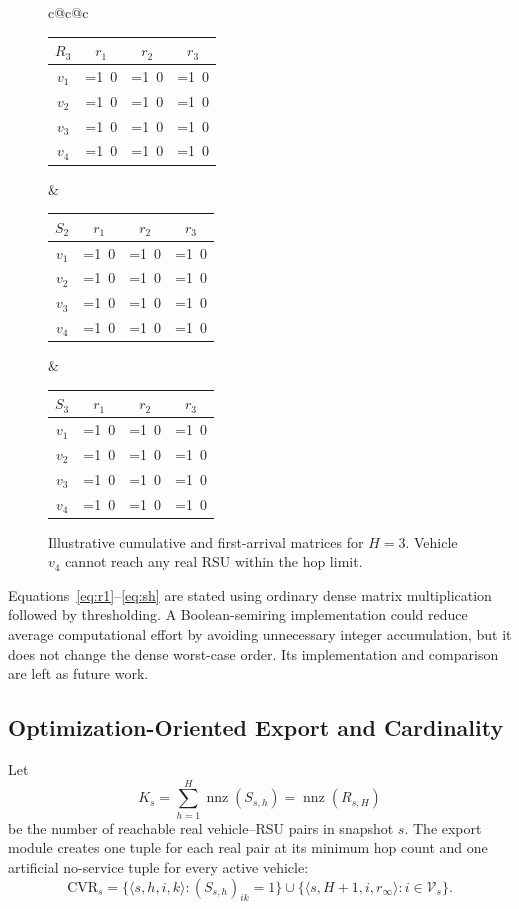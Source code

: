 \documentclass[engproc,proceedingpaper,submit,oneauthor]{Definitions/mdpi}
\newcommand{\added}[1]{{\color{revisionblue}#1}}
\newcommand{\nnz}{\operatorname{nnz}}
\newcommand{\CVR}{\mathrm{CVR}}
\begin{document}
\begin{figure}[H]
\centering
\newcommand{\hc}[1]{\ifnum#1=1\cellcolor{violet!60}\textcolor{white}{1}\else\cellcolor{gray!8}0\fi}
\small
\begin{tabular}{c@{\hskip 6mm}c@{\hskip 6mm}c}
\begin{tabular}{c|ccc}
$R_3$ & $r_1$ & $r_2$ & $r_3$\\\hline
$v_1$ & \hc1 & \hc1 & \hc1\\
$v_2$ & \hc1 & \hc1 & \hc1\\
$v_3$ & \hc1 & \hc1 & \hc1\\
$v_4$ & \hc0 & \hc0 & \hc0
\end{tabular}&
\begin{tabular}{c|ccc}
$S_2$ & $r_1$ & $r_2$ & $r_3$\\\hline
$v_1$ & \hc0 & \hc0 & \hc1\\
$v_2$ & \hc1 & \hc1 & \hc0\\
$v_3$ & \hc0 & \hc0 & \hc1\\
$v_4$ & \hc0 & \hc0 & \hc0
\end{tabular}&
\begin{tabular}{c|ccc}
$S_3$ & $r_1$ & $r_2$ & $r_3$\\\hline
$v_1$ & \hc0 & \hc1 & \hc0\\
$v_2$ & \hc0 & \hc0 & \hc0\\
$v_3$ & \hc1 & \hc0 & \hc0\\
$v_4$ & \hc0 & \hc0 & \hc0
\end{tabular}
\end{tabular}
\caption{Illustrative cumulative and first-arrival matrices for $H=3$. Vehicle $v_4$ cannot reach any real RSU within the hop limit.}\label{fig:matrices}
\end{figure}

Equations~\eqref{eq:r1}--\eqref{eq:sh} are stated using ordinary dense matrix multiplication followed by thresholding. \added{A Boolean-semiring implementation could reduce average computational effort by avoiding unnecessary integer accumulation, but it does not change the dense worst-case order. Its implementation and comparison are left as future work.}

\subsection{Optimization-Oriented Export and Cardinality}
Let
\[
K_s=\sum_{h=1}^{H}\nnz(S_{s,h})=\nnz(R_{s,H})
\]
be the number of reachable real vehicle--RSU pairs in snapshot $s$. The export module creates one tuple for each real pair at its minimum hop count and one artificial no-service tuple for every active vehicle:
\[
\CVR_s=
\{\langle s,h,i,k\rangle:(S_{s,h})_{ik}=1\}
\cup
\{\langle s,H+1,i,r_\infty\rangle:i\in\mathcal V_s\}.
\]
\end{document}
